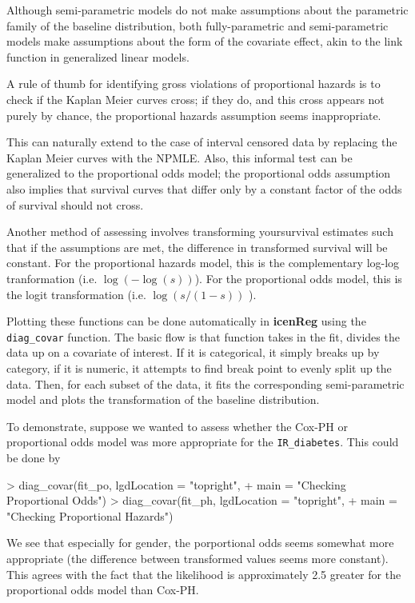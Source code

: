 \documentclass[a4paper]{article}
\begin{document}
Although semi-parametric models do not make assumptions about the parametric family of the baseline distribution, both fully-parametric and semi-parametric models make assumptions about the form of the covariate effect, akin to the link function in generalized linear models. 
  
A rule of thumb for identifying gross violations of proportional hazards is to check if the Kaplan Meier curves cross; if they do, and this cross appears not purely by chance, the proportional hazards assumption seems inappropriate. 
  
This can naturally extend to the case of interval censored data by replacing the Kaplan Meier curves with the NPMLE. Also, this informal test can be generalized to the proportional odds model; the proportional odds assumption also implies that survival curves that differ only by a constant factor of the odds of survival should not cross. 
  
Another method of assessing involves transforming yoursurvival estimates such that if the assumptions are met, the difference in transformed survival will be constant. For the proportional hazards model, this is the complementary log-log tranformation (i.e. $\log (-\log(s) )$). For the proportional odds model, this is the logit transformation (i.e. $\log(s/(1-s))$ ).
  
Plotting these functions can be done automatically in {\bf icenReg} using the \texttt{diag\_covar} function. The basic flow is that function takes in the fit, divides the data up on a covariate of interest. If it is categorical, it simply breaks up by category, if it is numeric, it attempts to find break point to evenly split up the data. Then, for each subset of the data, it fits the corresponding semi-parametric model and plots the transformation of the baseline distribution. 
 
To demonstrate, suppose we wanted to assess whether the Cox-PH or proportional odds model was more appropriate for the \texttt{IR\_diabetes}. This could be done by 
 
\begin{Schunk}
\begin{Sinput}
> diag_covar(fit_po, lgdLocation = "topright", 
+            main = "Checking Proportional Odds")
> diag_covar(fit_ph, lgdLocation = "topright", 
+            main = "Checking Proportional Hazards")
\end{Sinput}
\end{Schunk}

We see that especially for gender, the porportional odds
seems somewhat more appropriate (the difference between 
transformed values seems more constant). This agrees
with the fact that the likelihood is approximately 2.5 greater
for the proportional odds model than Cox-PH. 
  
\end{document}
